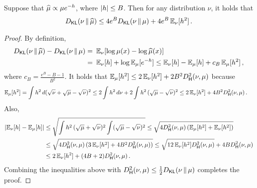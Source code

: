 \begin{lemma}\label{lem:KL-perturb}
Suppose that $\widehat{\mu}\propto \mu e^{-h}$, where $\lvert h\rvert\leq B$. Then for any distribution $\nu$, it holds that
\begin{align*}
    \Dkl{\nu}{\muhat}\leq 4e^B\Dkl{\nu}{\mu}+4e^B\En_\nu[h^2]\,.
\end{align*} 
\end{lemma}
\begin{proof}
By definition,
\begin{align*}
    \Dkl{\nu}{\muhat}-\Dkl{\nu}{\mu}=&~\En_{\nu}[\log \mu(x)-\log \muhat(x)] \\
    =&~ \En_\nu[h]+\log \En_{\mu}[e^{-h}]
    \leq \En_\nu[h]-\En_\mu[h]+c_B\En_\mu[h^2]\,,
\end{align*}
where $c_B=\frac{e^B-B-1}{B^2}$.
It holds that %
$\En_\mu[h^2]\leq 2\En_\nu[h^2]+2B^2\Dhels{\nu}{\mu}$ because
\begin{align*}
    \En_\mu[h^2]
    &= \int h^2\,d(\sqrt\nu+\sqrt\mu-\sqrt\nu)^2
    \le 2\int h^2\,d\nu + 2\int h^2\,(\sqrt\mu-\sqrt\nu)^2
    \le 2\En_\nu[h^2] + 4B^2 \Dhels{\nu}{\mu}\,.
\end{align*}
Also,
\begin{align*}
    \abs{\En_\nu[h]-\En_\mu[h]}
    &\leq \sqrt{\int h^2\,(\sqrt\mu+\sqrt\nu)^2\int (\sqrt\mu-\sqrt\nu)^2}
    \le \sqrt{4\Dhels{\nu}{\mu}\,(\En_\mu[h^2] + \En_\nu[h^2])} \\
    &\le \sqrt{4\Dhels{\nu}{\mu}\,(3\En_\nu[h^2] + 4B^2 \Dhels{\nu}{\mu})}
    \le \sqrt{12\En_\nu[h^2]\Dhels{\nu}{\mu}} + 4B\Dhels{\nu}{\mu} \\
    &\le 2\En_\nu[h^2] + (4B+2)\Dhels{\nu}{\mu}\,.
\end{align*}
Combining the inequalities above with $\Dhels{\nu}{\mu}\leq \frac12 \Dkl{\nu}{\mu}$ completes the proof.
\end{proof}






